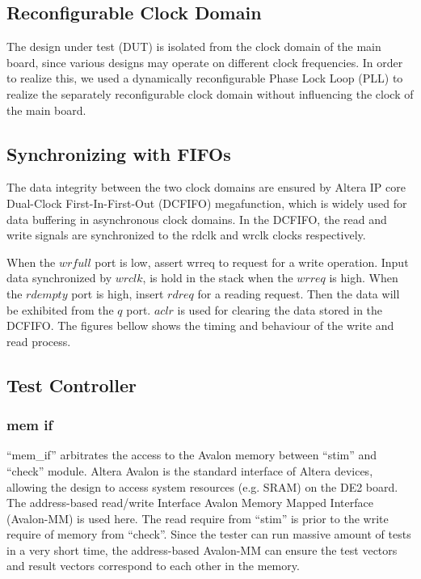 \subsection{Reconfigurable Clock Domain}
The design under test (DUT) is isolated from the clock domain of the main board, since various designs may operate on different clock frequencies. In order to realize this, we used a dynamically reconfigurable Phase Lock Loop (PLL) to realize the separately reconfigurable clock domain without influencing the clock of the main board.

\subsection{Synchronizing with FIFOs}
The data integrity between the two clock domains are ensured by Altera IP core Dual-Clock First-In-First-Out (DCFIFO) megafunction, which is widely used for data buffering in asynchronous clock domains. In the DCFIFO, the read and write signals are synchronized to the rdclk and wrclk clocks respectively.

When the $wrfull$ port is low, assert wrreq to request for a write operation. Input data synchronized by $wrclk$, is hold in the stack when the $wrreq$ is high. When the $rdempty$ port is high, insert $rdreq$ for a reading request. Then the data will be exhibited from the $q$ port. $aclr$ is used for clearing the data stored in the DCFIFO. The figures bellow shows the timing and behaviour of the write and read process.



\subsection{Test Controller}

\subsubsection{mem if}
``mem\_if'' arbitrates the access to the Avalon memory between ``stim'' and ``check'' module. Altera Avalon is the standard interface of Altera devices, allowing the design to access system resources (e.g. SRAM) on the DE2 board. The address-based read/write Interface Avalon Memory Mapped Interface (Avalon-MM) is used here. The read require from ``stim'' is prior to the write require of memory from ``check''. Since the tester can run massive amount of tests in a very short time, the address-based Avalon-MM can ensure the test vectors and result vectors correspond to each other in the memory.

